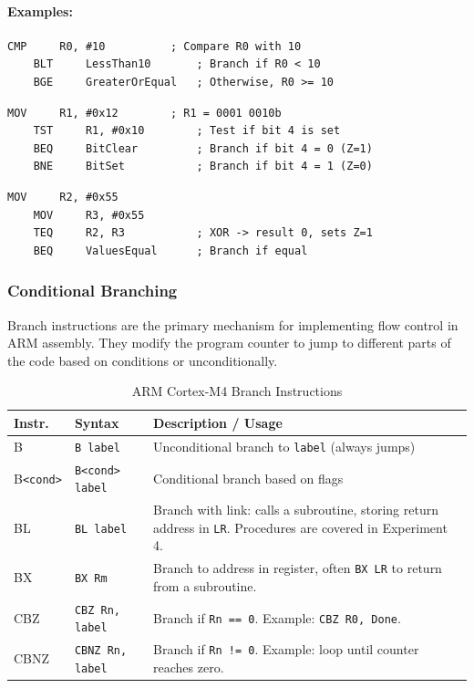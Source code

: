\noindent\paragraph{Examples:}
\hfill
\begin{lstlisting}[caption={Arithmetic comparison using CMP}]
    CMP     R0, #10          ; Compare R0 with 10
    BLT     LessThan10       ; Branch if R0 < 10
    BGE     GreaterOrEqual   ; Otherwise, R0 >= 10
\end{lstlisting}

\begin{lstlisting}[caption={Bit test using TST}]
    MOV     R1, #0x12        ; R1 = 0001 0010b
    TST     R1, #0x10        ; Test if bit 4 is set
    BEQ     BitClear         ; Branch if bit 4 = 0 (Z=1)
    BNE     BitSet           ; Branch if bit 4 = 1 (Z=0)
\end{lstlisting}

\begin{lstlisting}[caption={Equality check using TEQ}]
    MOV     R2, #0x55
    MOV     R3, #0x55
    TEQ     R2, R3           ; XOR -> result 0, sets Z=1
    BEQ     ValuesEqual      ; Branch if equal
\end{lstlisting}

\subsubsection{Conditional Branching}
Branch instructions are the primary mechanism for implementing flow control in ARM assembly. They modify the program counter to jump to different parts of the code based on conditions or unconditionally.

\begin{table}[H]
\centering
\caption{ARM Cortex-M4 Branch Instructions}
\small
\begin{tabularx}{\linewidth}{@{}l l X@{}}
\toprule
\textbf{Instr.} & \textbf{Syntax} & \textbf{Description / Usage} \\
\midrule
B       & \texttt{B label}        & Unconditional branch to \texttt{label} (always jumps) \\
B\texttt{<cond>} & \texttt{B<cond> label}  & Conditional branch based on flags \\
BL      & \texttt{BL label}       & Branch with link: calls a subroutine, storing return address in \texttt{LR}. Procedures are covered in Experiment 4. \\
BX      & \texttt{BX Rm}          & Branch to address in register, often \texttt{BX LR} to return from a subroutine. \\
CBZ     & \texttt{CBZ Rn, label}  & Branch if \texttt{Rn == 0}. Example: \texttt{CBZ R0, Done}. \\
CBNZ    & \texttt{CBNZ Rn, label} & Branch if \texttt{Rn != 0}. Example: loop until counter reaches zero. \\
\bottomrule
\end{tabularx}
\end{table}

